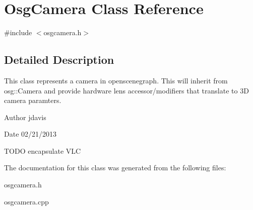 \hypertarget{classOsgCamera}{\section{Osg\-Camera Class Reference}
\label{classOsgCamera}
}


{\ttfamily \#include $<$osgcamera.\-h$>$}



\subsection{Detailed Description}
This class represents a camera in openscenegraph. This will inherit from osg\-::\-Camera and provide hardware lens accessor/modifiers that translate to 3\-D camera paramters.

\begin{DoxyAuthor}{Author}
jdavis 
\end{DoxyAuthor}
\begin{DoxyDate}{Date}
02/21/2013
\end{DoxyDate}
T\-O\-D\-O encapsulate V\-L\-C 

The documentation for this class was generated from the following files\-:\begin{DoxyCompactItemize}
\item 
osgcamera.\-h\item 
osgcamera.\-cpp\end{DoxyCompactItemize}
